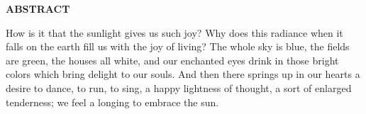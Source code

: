 \clearpage
\begin{centering}
\textbf{ABSTRACT}\\
\vspace{\baselineskip}
\end{centering}

How is it that the sunlight gives us such joy? Why does this radiance when it falls on the earth fill us with the joy of living? The whole sky is blue, the fields are green, the houses all white, and our enchanted eyes drink in those bright colors which bring delight to our souls. And then there springs up in our hearts a desire to dance, to run, to sing, a happy lightness of thought, a sort of enlarged tenderness; we feel a longing to embrace the sun. 


